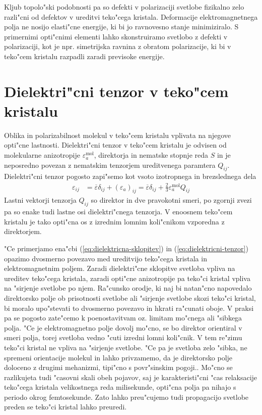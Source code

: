 \documentclass[12pt,twoside,openright,final]{report}
\begin{document}
Kljub topolo"ski podobnosti pa so defekti v polarizaciji svetlobe fizikalno zelo razli"cni od defektov v ureditvi teko"cega kristala. 
Deformacije elektromagnetnega polja ne nosijo elasti"cne energije, ki bi jo ravnovesno stanje minimiziralo. 
S primernimi opti"cnimi elementi lahko skonstruiramo svetlobo z defekti v polarizaciji, kot je npr. simetrijska ravnina z obratom polarizacije, ki bi v teko"cem kristalu razpadli zaradi previsoke energije. 

\section{Dielektri"cni tenzor v teko"cem kristalu}
\label{sec:dielektricnost}
Oblika in polarizabilnost molekul v teko"cem kristalu vplivata na njegove opti"cne lastnosti. 
Dielektri"cni tenzor v teko"cem kristalu je odvisen od molekularne anizotropije $\varepsilon_{a}^{\mathrm{mol}}$, direktorja in nematske stopnje reda $S$ in je neposredno povezan z nematskim tenzorjem ureditvenega paramtera $Q_{ij}$.
Dielektri"cni tenzor pogosto zapi"semo kot vsoto izotropnega in brezslednega dela \cite{degennes, ravnik-zumer-ldg}
\begin{align}
\label{eq:dielektricni-tenzor}
 \varepsilon_{ij} &= \overline\varepsilon \delta_{ij} + (\varepsilon_a)_{ij} = \overline\varepsilon\delta_{ij} + \frac{2}{3}\varepsilon_a^{\mathrm{mol}} Q_{ij}
\end{align}
Lastni vektorji tenzorja $Q_{ij}$ so direktor in dve pravokotni smeri, po zgornji zvezi pa so enake tudi lastne osi dielektri"cnega tenzorja. 
V enoosnem teko"cem kristalu je tako opti"cna os z izrednim lomnim koli"cnikom vzporedna z direktorjem. 

"Ce primerjamo ena"cbi (\ref{eq:dielektricna-sklopitev}) in (\ref{eq:dielektricni-tenzor}) opazimo dvosmerno povezavo med ureditvijo teko"cega kristala in elektromagnetnim poljem. 
Zaradi dielektri"cne sklopitve svetloba vpliva na ureditev teko"cega kristala, zaradi opti"cne anizotropije pa teko"ci kristal vpliva na "sirjenje svetlobe po njem. 
Ra"cunsko orodje, ki naj bi natan"cno napovedalo direktorsko polje ob prisotnosti svetlobe ali "sirjenje svetlobe skozi teko"ci kristal, bi moralo upo"stevati to dvosmerno povezavo in hkrati ra"cunati oboje. 
V praksi pa se pogosto zate"cemo k poenostavitvam oz. limitam mo"cnega ali "sibkega polja. 
"Ce je elektromagnetno polje dovolj mo"cno, se bo direktor orientiral v smeri polja, torej svetloba vedno "cuti izredni lomni koli"cnik. 
V tem re"zimu teko"ci kristal ne vpliva na "sirjenje svetlobe. 
"Ce pa je svetloba zelo "sibka, ne spremeni orientacije molekul in lahko privzamemo, da je direktorsko polje doloceno z drugimi mehanizmi, tipi"cno s povr"sinskim pogoji.. 
Mo"cno se razlikujeta tudi "casovni skali obeh pojavov, saj je karakteristi"cni "cas relaksacije teko"cega kristala velikostnega reda milisekunde, opti"cna polja pa nihajo s periodo okrog femtosekunde. 
Zato lahko preu"cujemo tudi propagacijo svetlobe preden se teko"ci kristal lahko preuredi. 
\end{document}
